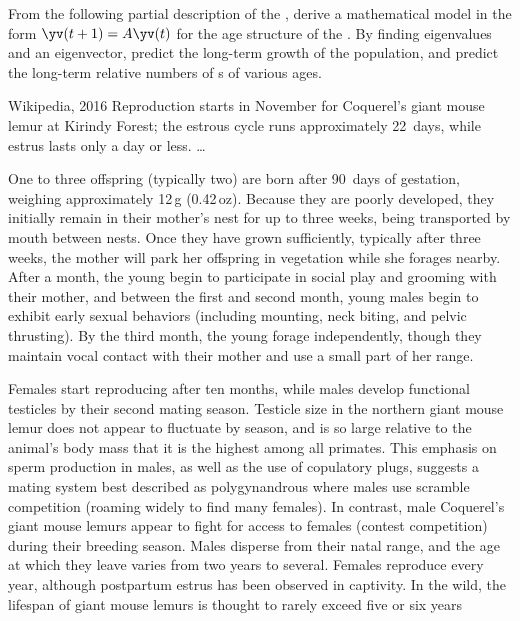 \begin{exercise} \label{ex:} 
From the following partial description of the , 
derive a mathematical model in the form \(\yv(t+1)=A\yv(t)\) for the age structure of the .
By finding eigenvalues and an eigenvector, predict the long-term growth of the population, and predict the long-term relative numbers of s of various ages.
\begin{quoted}{Wikipedia, 2016}
Reproduction starts in November for Coquerel's giant mouse lemur at Kirindy Forest; the estrous cycle runs approximately 22~days, while estrus lasts only a day or less. \ldots

One to three offspring (typically two) are born after 90~days of gestation, weighing approximately 12\,g (0.42\,oz). Because they are poorly developed, they initially remain in their mother's nest for up to three weeks, being transported by mouth between nests. Once they have grown sufficiently, typically after three weeks, the mother will park her offspring in vegetation while she forages nearby. After a month, the young begin to participate in social play and grooming with their mother, and between the first and second month, young males begin to exhibit early sexual behaviors (including mounting, neck biting, and pelvic thrusting). By the third month, the young forage independently, though they maintain vocal contact with their mother and use a small part of her range.

Females start reproducing after ten months, while males develop functional testicles by their second mating season. Testicle size in the northern giant mouse lemur does not appear to fluctuate by season, and is so large relative to the animal's body mass that it is the highest among all primates. This emphasis on sperm production in males, as well as the use of copulatory plugs, suggests a mating system best described as polygynandrous where males use scramble competition (roaming widely to find many females). In contrast, male Coquerel's giant mouse lemurs appear to fight for access to females (contest competition) during their breeding season. Males disperse from their natal range, and the age at which they leave varies from two years to several. Females reproduce every year, although postpartum estrus has been observed in captivity. In the wild, the lifespan of giant mouse lemurs is thought to rarely exceed five or six years
\end{quoted}
\end{exercise}





